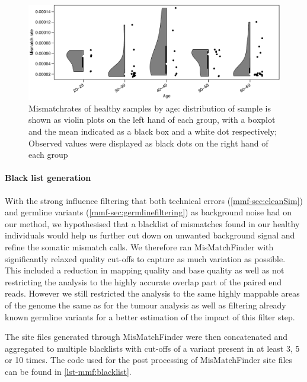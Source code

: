 \begin{figure}[ht]
\centering
\includegraphics[width=.99\linewidth]{Figures/MisMatchFinder/MisMatchRateByAge.pdf}
\caption[Mismatchrates of healthy samples by age]{Mismatchrates of healthy samples by age: distribution of sample is shown as violin plots on the left hand of each group, with a boxplot and the mean indicated as a black box and a white dot respectively; Observed values were displayed as black dots on the right hand of each group}\label{fig:mmf-mmrByAge}
\end{figure}


\paragraph{Black list generation}
\label{mmf-sec:healthyBlacklist}
With the strong influence filtering that both technical errors (\autoref{mmf-sec:cleanSim}) and germline variants (\autoref{mmf-sec:germlinefiltering})  as background noise had on our method, we hypothesised that a blacklist of mismatches found in our healthy individuals would help us further cut down on unwanted background signal and refine the somatic mismatch calls. We therefore ran MisMatchFinder with significantly relaxed quality cut-offs to capture as much variation as possible. This included a reduction in mapping quality and base quality as well as not restricting the analysis to the highly accurate overlap part of the paired end reads. However we still restricted the analysis to the same highly mappable areas of the genome the same as for the tumour analysis as well as filtering already known germline variants for a better estimation of the impact of this filter step.

The site files generated through MisMatchFinder were then concatenated and aggregated to multiple blacklists with cut-offs of a variant present in at least 3, 5 or 10 times. The code used for the post processing of MisMatchFinder site files can be found in \autoref{lst-mmf:blacklist}.


